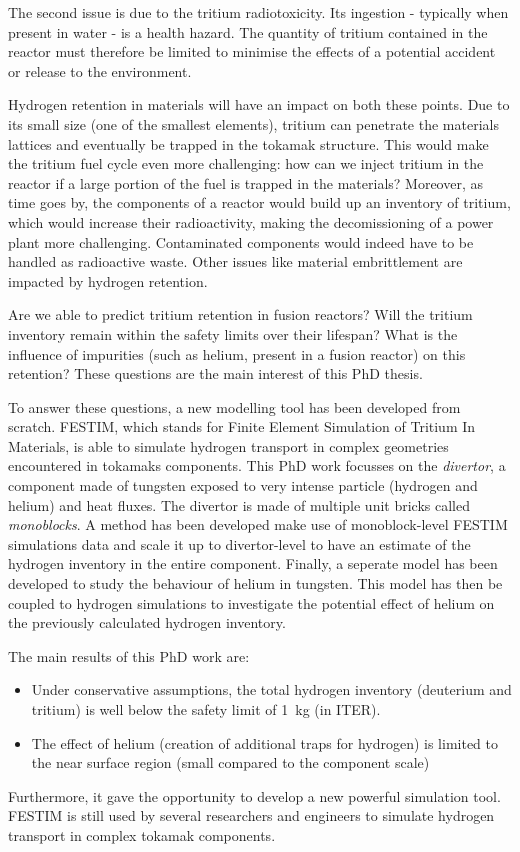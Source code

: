The second issue is due to the tritium radiotoxicity.
Its ingestion - typically when present in water - is a health hazard.
The quantity of tritium contained in the reactor must therefore be limited to minimise the effects of a potential accident or release to the environment.

Hydrogen retention in materials will have an impact on both these points.
Due to its small size (one of the smallest elements), tritium can penetrate the materials lattices and eventually be trapped in the tokamak structure.
This would make the tritium fuel cycle even more challenging: how can we inject tritium in the reactor if a large portion of the fuel is trapped in the materials?
Moreover, as time goes by, the components of a reactor would build up an inventory of tritium, which would increase their radioactivity, making the decomissioning of a power plant more challenging.
Contaminated components would indeed have to be handled as radioactive waste.
Other issues like material embrittlement are impacted by hydrogen retention.

Are we able to predict tritium retention in fusion reactors?
Will the tritium inventory remain within the safety limits over their lifespan?
What is the influence of impurities (such as helium, present in a fusion reactor) on this retention?
These questions are the main interest of this PhD thesis.

To answer these questions, a new modelling tool has been developed from scratch.
FESTIM, which stands for Finite Element Simulation of Tritium In Materials, is able to simulate hydrogen transport in complex geometries encountered in tokamaks components.
This PhD work focusses on the \textit{divertor}, a component made of tungsten exposed to very intense particle (hydrogen and helium) and heat fluxes. 
The divertor is made of multiple unit bricks called \textit{monoblocks}.
A method has been developed make use of monoblock-level FESTIM simulations data and scale it up to divertor-level to have an estimate of the hydrogen inventory in the entire component.
Finally, a seperate model has been developed to study the behaviour of helium in tungsten.
This model has then be coupled to hydrogen simulations to investigate the potential effect of helium on the previously calculated hydrogen inventory.

The main results of this PhD work are:
\begin{itemize}
    \item Under conservative assumptions, the total hydrogen inventory (deuterium and tritium) is well below the safety limit of \SI{1}{kg} (in ITER).
    \item The effect of helium (creation of additional traps for hydrogen) is limited to the near surface region (small compared to the component scale)
\end{itemize}

Furthermore, it gave the opportunity to develop a new powerful simulation tool.
FESTIM is still used by several researchers and engineers to simulate hydrogen transport in complex tokamak components.
